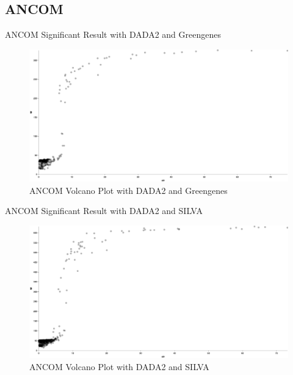 \documentclass[a4paper]{article}
\begin{document}
        \subsection{ANCOM}

            \begin{table}[p]
                \centering
                \caption{ANCOM Significant Result with DADA2 and Greengenes}
                \label{tb:ANCOM-dada2-gg}

            \end{table}

            \begin{figure}[p]
                \centering
                \includegraphics[width=0.8 \linewidth]{figures/ANCOM/DADA2.gg.png}
                \caption{ANCOM Volcano Plot with DADA2 and Greengenes}
                \label{fig:volcano-dada2-gg}
            \end{figure}

            \begin{table}[p]
                \centering
                \caption{ANCOM Significant Result with DADA2 and SILVA}
                \label{tb:ANCOM-dada2-silva}

            \end{table}

            \begin{figure}[p]
                \centering
                \includegraphics[width=0.8 \linewidth]{figures/ANCOM/DADA2.silva.png}
                \caption{ANCOM Volcano Plot with DADA2 and SILVA}
                \label{fig:volcano-dada2-silva}
            \end{figure}
\end{document}
